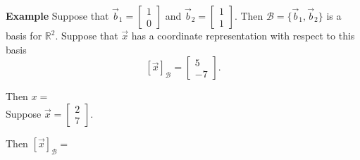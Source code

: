  \begin{frame}[fragile]
\textbf{Example}
 Suppose that $\vec{b}_1 = \left[\begin{array}{rrrrrr} 1 \\ 0 \end{array} \right] $
and $\vec{b}_2 = \left[\begin{array}{rrrrrr}1 \\ 1 \end{array} \right] $.  Then 
${\mathcal B} = \{ \vec{b}_1, \vec{b}_2 \}$ is a basis for $\mathbb R^2$.
Suppose that $\vec{x}$ has a coordinate representation with respect to this basis
\[
[\vec{x} ]_{\mathcal B} = \left[\begin{array}{rrrrrr} 5 \\ -7 \end{array} \right] .
\]

Then ${x} = $  \\ 
%

Suppose $\vec{x} = \left[\begin{array}{rrrrrr} 2 \\ 7  \end{array} \right] $.

Then $[\vec{x}]_{\mathcal B}=$

%
%


\end{frame}






